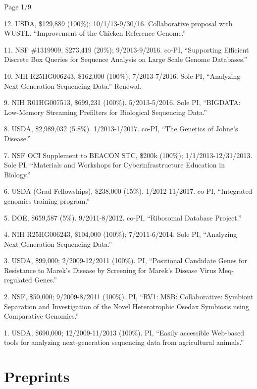 \documentclass[margin,line]{resume}
\begin{document}
\begin{resume}
{\centerline {Page 1/9}}

\newpage

12. USDA, \$129,889 (100\%); 10/1/13-9/30/16.  Collaborative proposal with WUSTL. ``Improvement of the Chicken Reference Genome.''

11. NSF \#1319909, \$273,419 (20\%); 9/2013-9/2016. co-PI, ``Supporting Efficient Discrete Box Queries for Sequence Analysis on Large Scale Genome Databases.''

10. NIH R25HG006243, \$162,000 (100\%); 7/2013-7/2016.  Sole PI, ``Analyzing Next-Generation Sequencing Data.'' Renewal.

9. NIH R01HG007513, \$699,231 (100\%). 5/2013-5/2016. Sole PI, ``BIGDATA: Low-Memory Streaming Prefilters for Biological Sequencing Data.''

8. USDA, \$2,989,032 (5.8\%). 1/2013-1/2017.  co-PI, ``The Genetics of Johne's Disease.''

7. NSF OCI Supplement to BEACON STC, \$200k (100\%); 1/1/2013-12/31/2013.  Sole PI, ``Materials and Workshops for Cyberinfrastructure Education in Biology.''

6. USDA (Grad Fellowships), \$238,000 (15\%).  1/2012-11/2017.  co-PI, ``Integrated genomics training program.''

5. DOE, \$659,587 (5\%).  9/2011-8/2012.  co-PI, ``Ribosomal Database Project.''

4. NIH R25HG006243, \$104,000 (100\%); 7/2011-6/2014.  Sole PI, ``Analyzing Next-Generation Sequencing Data.''

3. USDA, \$99,000; 2/2009-12/2011 (100\%).  PI, ``Positional Candidate Genes for Resistance to Marek's
Disease by Screening for Marek's Disease Virus Meq-regulated Genes.''

2. NSF, \$50,000; 9/2009-8/2011 (100\%).  PI, ``RV1: MSB: Collaborative: Symbiont Separation and Investigation of the Novel Heterotrophic Osedax Symbiosis using Comparative Genomics.''

1. USDA, \$690,000; 12/2009-11/2013 (100\%).  PI, ``Easily accessible Web-based tools for analyzing next-generation sequencing data from agricultural animals.''


    \section{\mysidestyle Preprints}


\end{resume}
\end{document}

